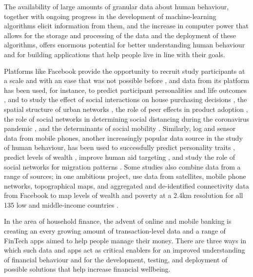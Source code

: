 The availability of large amounts of granular data about human behaviour,
together with ongoing progress in the development of machine-learning
algorithms elicit information from them, and the increase in computer power
that allows for the storage and processing of the data and the deployment of
these algorithms, offers enormous potential for better understanding human
behaviour \citep{jaffe2014big, buyalskaya2021golden} and for building
applications that help people live in line with their goals.

Platforms like Facebook provide the opportunity to recruit study participants
at a scale and with an ease that was not possible before
\citep{kosinski2015facebook}, and data from its platform has been used, for
instance, to predict participant personalities and life outcomes
\citep{youyou2015computer}, and to study the effect of social interactions on
house purchasing decisions \citep{bailey2018economic, bailey2019house}, the
spatial structure of urban networks \citep{bailey2020social}, the role of peer
effects in product adoption \citep{bailey2019peer}, the role of social networks
in determining social distancing during the coronavirus pandemic
\citep{bailey2020social}, and the determinants of social mobility
\citep{chetty2022sociali, chetty2022socialii}. Similarly, log and sensor data
from mobile phones, another increasingly popular data source in the study of
human behaviour, has been used to successfully predict personality traits
\citep{montjoye2013predicting, stachl2020predicting}, predict levels of wealth
\citep{blumenstock2015predicting}, improve human aid targeting
\citep{aiken2022machine}, and study the role of social networks for migration
patterns \citep{blumenstock2019migration}. Some studies also combine data from
a range of sources; in one ambitious project, \citet{chi2022microestimates} use
data from satellites, mobile phone networks, topographical maps, and aggregated
and de-identified connectivity data from Facebook to map levels of wealth and
poverty at a 2.4km resolution for all 135 low and middle-income countries
\citep{chi2022microestimates}.

In the area of household finance, the advent of online and mobile banking is
creating an every growing amount of transaction-level data and a range of
FinTech apps aimed to help people manage their money. There are three ways in
which such data and apps act as critical enablers for an improved understanding
of financial behaviour and for the development, testing, and deployment of
possible solutions that help increase financial wellbeing.

